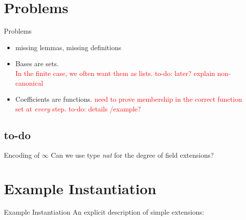 \documentclass[%
	sans,
	12pt,
]{beamer}
\newcommand{\bad}[1]{\textcolor{red}{#1}}
\begin{document}
\section{Problems}
\begin{frame}{Problems}
\begin{itemize}
	\item missing lemmas, missing definitions\pause %
	\item Bases are sets.\\\pause
	\bad{In the finite case, we often want them as lists. to-do: later? explain non-canonical}
	\item Coefficients are functions.
	\bad{need to prove membership in the correct function set at \emph{every} step.
		to-do: details /example?}
\end{itemize}
\end{frame}

\subsection{to-do}
\begin{frame}{Encoding of $\infty$}%
Can we use type \emph{nat} for the degree of field extensions?\pause
{}
\end{frame}

\section{Example Instantiation}

\begin{frame}{Example Instantiation}%
An explicit description of simple extensions: %
\end{frame}
\end{document}
